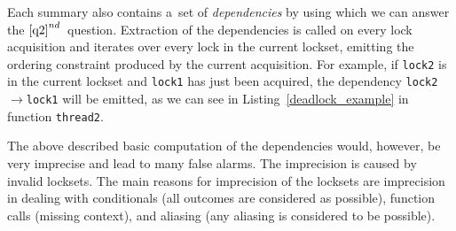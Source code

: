 \documentclass{ExcelAtFIT}
\begin{document}
Each summary also contains a~set of \textit{dependencies} by using which we can answer the $\ref{q2}^{nd}$~question. Extraction of the dependencies is called on every lock acquisition and iterates over every lock in the current lockset, emitting the ordering constraint produced by the current acquisition. For example, if \texttt{lock2} is in the current lockset and \texttt{lock1} has just been acquired, the dependency \texttt{lock2$\rightarrow$lock1} will be emitted, as we can see in Listing~\ref{deadlock_example} in function \texttt{thread2}.

The above described basic computation of the dependencies would, however, be very imprecise and lead to many false alarms. The imprecision is caused by invalid locksets. The main reasons for imprecision of the locksets are imprecision in dealing with conditionals (all outcomes are considered as possible), function calls (missing context), and aliasing (any aliasing is considered to be possible).
\end{document}
